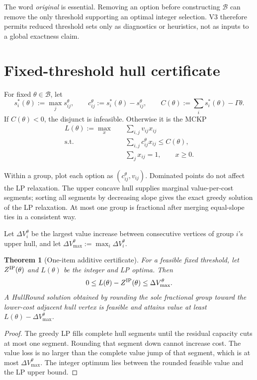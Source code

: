 \documentclass[11pt,a4paper]{article}
\newtheorem{theorem}{Theorem}
\theoremstyle{definition}
\theoremstyle{remark}
\newcommand{\B}{\mathcal B}
\begin{document}
The word \emph{original} is essential. Removing an option before constructing
$\B$ can remove the only threshold supporting an optimal integer selection.
V3 therefore permits reduced threshold sets only as diagnostics or heuristics,
not as inputs to a global exactness claim.

\section{Fixed-threshold hull certificate}

For fixed $\theta\in\B$, let
\[
  s_i^*(\theta):=\max_j s_{ij}^{\theta},\qquad
  c_{ij}^{\theta}:=s_i^*(\theta)-s_{ij}^{\theta},\qquad
  C(\theta):=\sum_i s_i^*(\theta)-\Gamma\theta.
\]
If $C(\theta)<0$, the disjunct is infeasible. Otherwise it is the MCKP
\begin{align*}
 L(\theta):=\max_x\quad &\sum_{i,j}v_{ij}x_{ij}\\
 \text{s.t.}\quad &\sum_{i,j}c_{ij}^{\theta}x_{ij}\le C(\theta),\\
 &\sum_jx_{ij}=1,\qquad x\ge0.
\end{align*}

Within a group, plot each option as
$(c_{ij}^{\theta},v_{ij})$. Dominated points do not affect the LP relaxation.
The upper concave hull supplies marginal value-per-cost segments; sorting all
segments by decreasing slope gives the exact greedy solution of the LP
relaxation. At most one group is fractional after merging equal-slope ties in a
consistent way.

Let $\Delta V_i^{\theta}$ be the largest value increase between consecutive
vertices of group $i$'s upper hull, and let
$\Delta V_{\max}^{\theta}:=\max_i\Delta V_i^{\theta}$.

\begin{theorem}[One-item additive certificate]
For a feasible fixed threshold, let $Z^{\rm IP}(\theta)$ and $L(\theta)$ be the
integer and LP optima. Then
\[
  0\le L(\theta)-Z^{\rm IP}(\theta)
  \le \Delta V_{\max}^{\theta}.
\]
A HullRound solution obtained by rounding the sole fractional group toward
the lower-cost adjacent hull vertex is feasible and attains value at least
$L(\theta)-\Delta V_{\max}^{\theta}$.
\end{theorem}

\begin{proof}
The greedy LP fills complete hull segments until the residual capacity cuts at
most one segment. Rounding that segment down cannot increase cost. The value
loss is no larger than the complete value jump of that segment, which is at
most $\Delta V_{\max}^{\theta}$. The integer optimum lies between the rounded
feasible value and the LP upper bound.
\end{proof}
\end{document}
